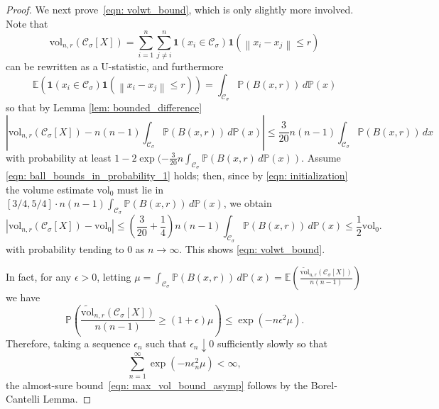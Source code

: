 \documentclass[11pt,twoside]{article}
\newcommand{\vol}{\mathrm{vol}}
\newcommand{\abs}[1]{\left \lvert #1 \right \rvert}
\newcommand{\norm}[1]{\left\lVert#1\right\rVert}
\newcommand{\1}{\mathbf{1}}
\newcommand{\Xbf}{X}             %
\newcommand{\Pbb}{\mathbb{P}}
\newcommand{\Ebb}{\mathbb{E}}
\newcommand{\Cset}{\mathcal{C}}
\newcommand{\Csig}{\Cset_{\sigma}}
\newcommand{\dx}{\,dx}
\begin{document}
\begin{proof}
	We next prove~\eqref{eqn: volwt_bound}, which is only slightly more involved. Note that
	\begin{equation*}
	\vol_{n,r}(\Csig[\Xbf]) = \sum_{i = 1}^{n} \sum_{j \neq i}^{n} \1(x_i \in \Csig) \1(\norm{x_i - x_j} \leq r)
	\end{equation*}
	can be rewritten as a U-statistic, and furthermore
	\begin{equation*}
	\Ebb\left(\1(x_i \in \Csig) \1(\norm{x_i - x_j} \leq r)\right) = \int_{\Csig} \Pbb(B(x,r)) \,d\Pbb(x)
	\end{equation*}
	\noindent so that by Lemma \ref{lem: bounded_difference}
	\begin{equation}
	\label{eqn: ball_bounds_in_probability_1}
	\abs{\vol_{n,r}(\Csig[\Xbf]) - n(n-1)\int_{\Csig} \Pbb(B(x,r)) \,d\Pbb(x) }\leq \frac{3}{20}n(n-1)\int_{\Csig} \Pbb(B(x,r)) \dx 
	\end{equation}
	with probability at least $1 - 2\exp(-\frac{3}{20}n \int_{\Csig} \Pbb(B(x,r) \,d\Pbb(x))$. Assume \eqref{eqn: ball_bounds_in_probability_1} holds; then, since by \eqref{eqn: initialization} the volume estimate $\vol_0$ must lie in $[3/4,5/4] \cdot n(n-1)\int_{\Csig} \Pbb(B(x,r)) \,d\Pbb(x)$, we obtain
	\begin{equation*}
	\abs{\vol_{n,r}(\Csig[\Xbf]) - \vol_0} \leq \left(\frac{3}{20} + \frac{1}{4}\right) n(n-1)\int_{\Csig} \Pbb(B(x,r)) \,d\Pbb(x) \leq \frac{1}{2} \vol_0.
	\end{equation*}
	with probability tending to $0$ as $n \to \infty$. This shows \eqref{eqn: volwt_bound}.
	
	In fact,  for any $\epsilon > 0$, letting $\mu = \int_{\Csig} \Pbb(B(x,r)) \,d\Pbb(x) = \Ebb\left(\frac{\widetilde{\vol}_{n,r}(\Csig[\Xbf])}{n(n-1)}\right)$ we have
	\begin{equation*}
	\Pbb\left(\frac{\widetilde{\vol}_{n,r}(\Csig[\Xbf])}{n(n-1)} \geq (1 + \epsilon)\mu \right) \leq \exp(-n\epsilon^2\mu).
	\end{equation*}
	Therefore, taking a sequence $\epsilon_n$ such that $\epsilon_n \downarrow 0$ sufficiently slowly so that
	\begin{equation*}
	\sum_{n = 1}^{\infty}\exp(-n\epsilon_n^2\mu) < \infty,
	\end{equation*}
	the almost-sure bound~\eqref{eqn: max_vol_bound_asymp} follows by the Borel-Cantelli Lemma.
\end{proof}
\end{document}
